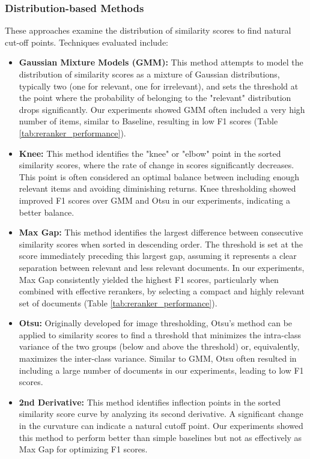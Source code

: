 \subsubsection{Distribution-based Methods}
These approaches examine the distribution of similarity scores to find natural cut-off points. Techniques evaluated include:
\begin{itemize}
    \item \textbf{Gaussian Mixture Models (GMM):} This method attempts to model the distribution of similarity scores as a mixture of Gaussian distributions, typically two (one for relevant, one for irrelevant), and sets the threshold at the point where the probability of belonging to the "relevant" distribution drops significantly. Our experiments showed GMM often included a very high number of items, similar to Baseline, resulting in low F1 scores (Table \ref{tab:reranker_performance}).
    \item \textbf{Knee:} This method identifies the "knee" or "elbow" point in the sorted similarity scores, where the rate of change in scores significantly decreases. This point is often considered an optimal balance between including enough relevant items and avoiding diminishing returns. Knee thresholding showed improved F1 scores over GMM and Otsu in our experiments, indicating a better balance.
    \item \textbf{Max Gap:} This method identifies the largest difference between consecutive similarity scores when sorted in descending order. The threshold is set at the score immediately preceding this largest gap, assuming it represents a clear separation between relevant and less relevant documents. In our experiments, Max Gap consistently yielded the highest F1 scores, particularly when combined with effective rerankers, by selecting a compact and highly relevant set of documents (Table \ref{tab:reranker_performance}).
    \item \textbf{Otsu:} Originally developed for image thresholding, Otsu's method can be applied to similarity scores to find a threshold that minimizes the intra-class variance of the two groups (below and above the threshold) or, equivalently, maximizes the inter-class variance. Similar to GMM, Otsu often resulted in including a large number of documents in our experiments, leading to low F1 scores.
    \item \textbf{2nd Derivative:} This method identifies inflection points in the sorted similarity score curve by analyzing its second derivative. A significant change in the curvature can indicate a natural cutoff point. Our experiments showed this method to perform better than simple baselines but not as effectively as Max Gap for optimizing F1 scores.
\end{itemize}

